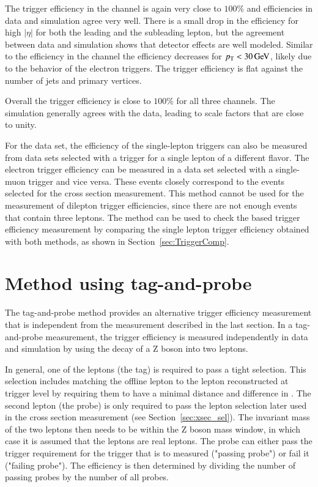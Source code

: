 The trigger efficiency in the \emu channel is again very close to $100\%$ and efficiencies in data and simulation agree very well. There is a small drop in the efficiency for high $|\eta|$ for both the leading and the subleading lepton, but the agreement between data and simulation shows that detector effects are well modeled.
Similar to the efficiency in the \ee channel the efficiency decreases for $p_{\mathrm{T}} < 30 \,\text{Ge\hspace{-.08em}V}$, likely due to the behavior of the electron triggers.
The trigger efficiency is flat against the number of jets and primary vertices.

Overall the trigger efficiency is close to $100\%$ for all three channels. The simulation generally agrees with the data, leading to scale factors that are close to unity.

For the \emu data set, the efficiency of the single-lepton triggers can also be measured from data sets selected with a trigger for a single lepton of a different flavor. The electron trigger efficiency can be measured in a data set selected with a single-muon trigger and vice versa.
These events closely correspond to the events selected for the \ttbar cross section measurement.
This method cannot be used for the measurement of dilepton trigger efficiencies, since there are not enough events that contain three leptons.
The method can be used to check the \ETm based trigger efficiency measurement by comparing the single lepton trigger efficiency obtained with both methods, as shown in Section~\ref{sec:TriggerComp}.

\section{Method using tag-and-probe}  %
\label{sec:TriggerTPMethod}

The tag-and-probe method provides an alternative trigger efficiency measurement that is independent from the measurement described in the last section.
In a tag-and-probe measurement, the trigger efficiency is measured independently in data and simulation by using the decay of a Z boson into two leptons.

In general, one of the leptons (the tag) is required to pass a tight selection. This selection includes matching the offline lepton to the lepton reconstructed at trigger level by requiring them to have a minimal distance and difference in \pt. The second lepton (the probe) is only required to pass the lepton selection later used in the \ttbar cross section measurement (see Section~\ref{sec:xsec_sel}). The invariant mass of the two leptons then needs to be within the Z boson mass window, in which case it is assumed that the leptons are real leptons.
The probe can either pass the trigger requirement for the trigger that is to measured ("passing probe") or fail it ("failing probe"). The efficiency is then determined by dividing the number of passing probes by the number of all probes.

